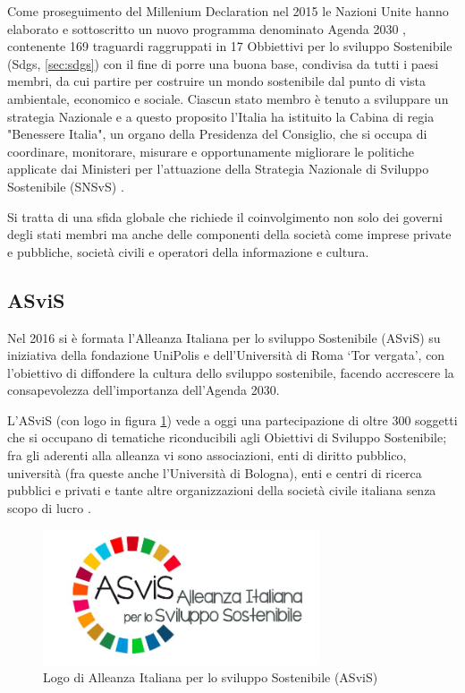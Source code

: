 Come proseguimento del Millenium Declaration nel 2015 le Nazioni Unite hanno elaborato e sottoscritto un nuovo programma denominato Agenda 2030 \cite{agenda2030}, contenente 169 traguardi raggruppati in 17 Obbiettivi per lo sviluppo Sostenibile (Sdgs, \ref{sec:sdgs}) con il fine di porre una buona base, condivisa da tutti i paesi membri, da cui partire per costruire un mondo sostenibile dal punto di vista ambientale, economico e sociale.
%
Ciascun stato membro è tenuto a sviluppare un strategia Nazionale e a questo proposito l'Italia ha istituito la Cabina di regia "Benessere Italia", un organo della Presidenza del Consiglio, che si occupa di coordinare, monitorare, misurare e opportunamente migliorare le politiche applicate dai Ministeri per l'attuazione della Strategia Nazionale di Sviluppo Sostenibile (SNSvS) \cite{SNSvS}.

Si tratta di una sfida globale che richiede il coinvolgimento non solo dei governi degli stati membri ma anche delle componenti della società come imprese private e pubbliche, società civili e operatori della informazione e cultura.

\subsection{ASviS}
Nel 2016 si è formata l'Alleanza Italiana per lo sviluppo Sostenibile (ASviS) \cite{asvis} su iniziativa della fondazione UniPolis e dell'Università di Roma \enquote*{Tor vergata}, con l'obiettivo di diffondere la cultura dello sviluppo sostenibile, facendo accrescere la consapevolezza dell'importanza dell'Agenda 2030.

L'ASviS (con logo in figura \ref{fig:asvis-logo}) vede a oggi una partecipazione di oltre 300 soggetti che si occupano di tematiche riconducibili agli Obiettivi di Sviluppo Sostenibile; fra gli aderenti alla alleanza vi sono associazioni, enti di diritto pubblico, università (fra queste anche l'Università di Bologna), enti e centri di ricerca pubblici e privati e tante altre organizzazioni della società civile italiana senza scopo di lucro \cite[Aderenti alla ASviS]{aderenti_asvis}.
\begin{figure}
    \center
    \includegraphics[height=4cm]{img/Logo-ASviS.jpg}
    \caption{Logo di Alleanza Italiana per lo sviluppo Sostenibile (ASviS)}
    \label{fig:asvis-logo}
\end{figure}
%
